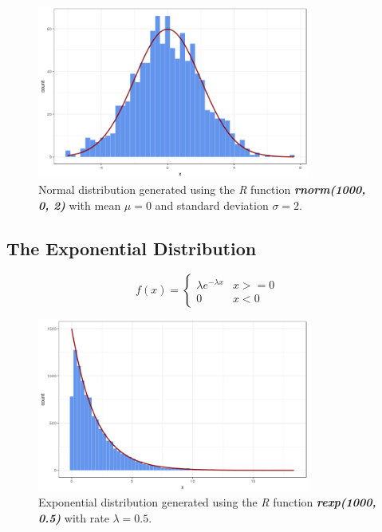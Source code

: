 \begin{figure}[H]
    \centering
    \includegraphics[width=0.8\textwidth]{img/gld_clustering/extra_images/normal_0_2.png}
    \caption{Normal distribution generated using the \textit{R} function \textbf{\textit{rnorm(1000, 0, 2)}} with mean $\mu = 0$ and standard deviation $\sigma = 2$.}
    \label{fig:normal_sample}
\end{figure}

\subsection{The Exponential Distribution}
\begin{equation}\label{eq:exponential_distribution}
  f(x) =
  \begin{cases}
    \lambda e^{-\lambda x} & \text{$x >= 0 $} \\
    0 & \text{$x < 0$}
  \end{cases}
\end{equation}

\begin{figure}[H]
    \centering
    \includegraphics[width=0.8\textwidth]{img/gld_clustering/extra_images/exp_05.png}
    \caption{Exponential distribution generated using the \textit{R} function \textbf{\textit{rexp(1000, 0.5)}} with rate $\lambda = 0.5$.}
    \label{fig:normal_sample}
\end{figure}

